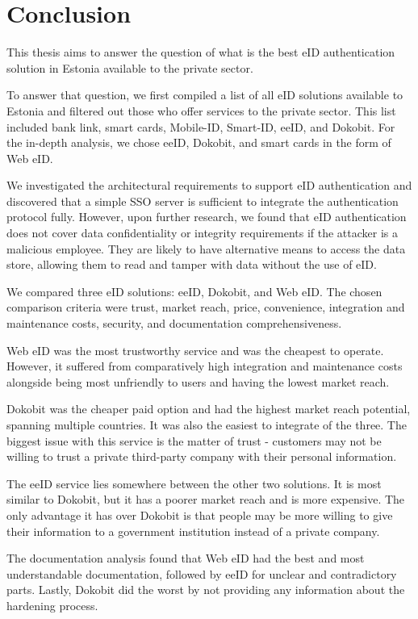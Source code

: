 \section{Conclusion}

This thesis aims to answer the question of what is the best eID authentication solution in Estonia available to the private sector.

To answer that question, we first compiled a list of all eID solutions available to Estonia and filtered out those who offer services to the private sector. This list included {bank link}, smart cards, Mobile-ID, Smart-ID, eeID, and Dokobit. For the in-depth analysis, we chose eeID, Dokobit, and smart cards in the form of Web eID.

We investigated the architectural requirements to support eID authentication and discovered that a simple SSO server is sufficient to integrate the authentication protocol fully. However, upon further research, we found that eID authentication does not cover data confidentiality or integrity requirements if the attacker is a malicious employee. They are likely to have alternative means to access the data store, allowing them to read and tamper with data without the use of eID.

We compared three eID solutions: eeID, Dokobit, and Web eID. The chosen comparison criteria were trust, market reach, price, convenience, integration and maintenance costs, security, and documentation comprehensiveness.

Web eID was the most trustworthy service and was the cheapest to operate. However, it suffered from comparatively high integration and maintenance costs alongside being most unfriendly to users and having the lowest market reach.

Dokobit was the cheaper paid option and had the highest market reach potential, spanning multiple countries. It was also the easiest to integrate of the three. The biggest issue with this service is the matter of trust - customers may not be willing to trust a private third-party company with their personal information.

The eeID service lies somewhere between the other two solutions. It is most similar to Dokobit, but it has a poorer market reach and is more expensive. The only advantage it has over Dokobit is that people may be more willing to give their information to a government institution instead of a private company.

The documentation analysis found that Web eID had the best and most understandable documentation, followed by eeID for unclear and contradictory parts. Lastly, Dokobit did the worst by not providing any information about the hardening process.

